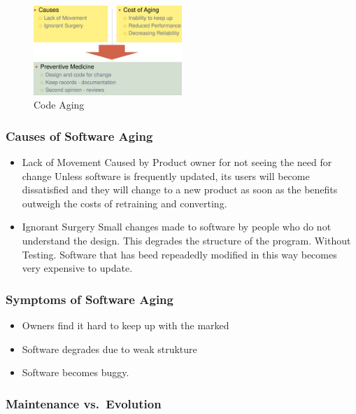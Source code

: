 \begin{figure}[H]
\centering
\includegraphics[width=0.5\textwidth]{figures/softwareAging.png}
\caption{Code Aging}
\end{figure}

\hypertarget{Causes of Software Aging}{%
\subsubsection{Causes of Software Aging}\label{Causes-of-Software-Aging}}
\begin{itemize}
    \item Lack of Movement
    \subitem Caused by Product owner for not seeing the need for change
    \subitem   Unless software is frequently updated, its users will become
  dissatisfied and they will change to a new product as soon as the
  benefits outweigh the costs of retraining and converting.
  
  \item Ignorant Surgery
  \subitem Small changes made to software by people who do not understand the design. This degrades the structure of the program. Without Testing.
  \subitem Software that has beed repeadedly modified in this way becomes very expensive to update.
\end{itemize}

\hypertarget{Symptoms of Software Aging}{%
\subsubsection{Symptoms of Software Aging}\label{Symptoms-of-Software-Aging}}
\begin{itemize}
    \item Owners find it hard to keep up with the marked
    \item Software degrades due to weak strukture
    \item Software becomes buggy.
\end{itemize}


\hypertarget{maintenance-vs.evolution}{%
\subsubsection{Maintenance
vs.~Evolution}\label{maintenance-vs.evolution}}

